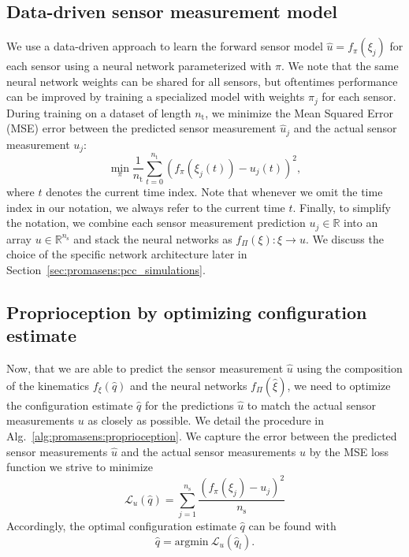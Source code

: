 \subsection{Data-driven sensor measurement model}
\label{sec:promasens:data_driven_approach}
We use a data-driven approach to learn the forward sensor model $\hat{u} = f_{\pi}(\xi_{j})$ for each sensor using a neural network parameterized with $\pi$.
We note that the same neural network weights can be shared for all sensors, but oftentimes performance can be improved by training a specialized model with weights $\pi_j$ for each sensor.
During training on a dataset of length $n_\mathrm{t}$, we minimize the Mean Squared Error (MSE) error between the predicted sensor measurement $\hat{u}_j$ and the actual sensor measurement $u_j$:
\begin{equation}
    \min_{\pi} \frac{1}{n_\mathrm{t}} \sum_{t = 0}^{n_\mathrm{t}} \left ( f_{\pi}(\xi_{j}(t)) - u_j(t) \right )^2,
\end{equation}
where $t$ denotes the current time index.
Note that whenever we omit the time index in our notation, we always refer to the current time $t$.
Finally, to simplify the notation, we combine each sensor measurement prediction $u_j \in \mathbb{R}$ into an array $u \in \mathbb{R}^{n_\mathrm{s}}$ and stack the neural networks as %
$f_\Pi(\xi): \xi \rightarrow u$. We discuss the choice of the specific network architecture later in Section~\ref{sec:promasens:pcc_simulations}.

\subsection{Proprioception by optimizing configuration estimate}
\label{sub:promasens:proprioception_optimization}

Now, that we are able to predict the sensor measurement $\hat{u}$ using the composition of the kinematics $f_\xi(\hat{q})$ and the neural networks $f_\Pi(\hat{\xi})$, we need to optimize the configuration estimate $\hat{q}$ for the predictions $\hat{u}$ to match the actual sensor measurements $u$ as closely as possible.
We detail the procedure in Alg.~\ref{alg:promasens:proprioception}.
We capture the error between the predicted sensor measurements $\hat{u}$ and the actual sensor measurements $u$ by the MSE loss function we strive to minimize
\begin{equation}\label{eq:promasens:proprioception_loss}
    \mathcal{L}_{u}(\hat{q}) = \sum_{j=1}^{n_\mathrm{s}} \frac{\left ( f_\pi(\xi_j) - u_j \right )^2}{n_\mathrm{s}}
\end{equation}
Accordingly, the optimal configuration estimate $\hat{q}$ can be found with
\begin{equation}
    \hat{q} = \mathrm{argmin} \: \mathcal{L}_{u}(\hat{q}_l).
\end{equation}


